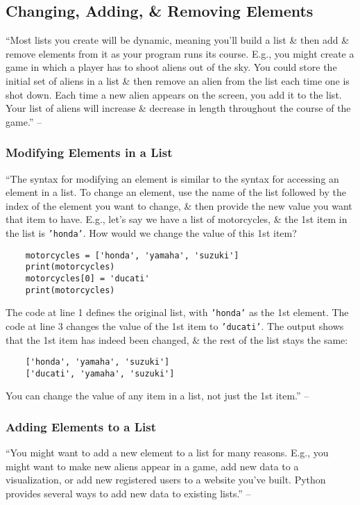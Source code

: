 \documentclass[oneside]{book}
\numberwithin{equation}{section}
\begin{document}
\subsection{Changing, Adding, \& Removing Elements}
``Most lists you create will be dynamic, meaning you'll build a list \& then add \& remove elements from it as your program runs its course. E.g., you might create a game in which a player has to shoot aliens out of the sky. You could store the initial set of aliens in a list \& then remove an alien from the list each time one is shot down. Each time a new alien appears on the screen, you add it to the list. Your list of aliens will increase \& decrease in length throughout the course of the game.'' -- \cite[p. 36]{Matthes2019}

\subsubsection{Modifying Elements in a List}
``The syntax for modifying an element is similar to the syntax for accessing an element in a list. To change an element, use the name of the list followed by the index of the element you want to change, \& then provide the new value you want that item to have. E.g., let's say we have a list of motorcycles, \& the 1st item in the list is \texttt{'honda'}. How would we change the value of this 1st item?
\begin{verbatim}
	motorcycles = ['honda', 'yamaha', 'suzuki']
	print(motorcycles)	
	motorcycles[0] = 'ducati'
	print(motorcycles)
\end{verbatim}
The code at line 1 defines the original list, with \texttt{'honda'} as the 1st element. The code at line 3 changes the value of the 1st item to \texttt{'ducati'}. The output shows that the 1st item has indeed been changed, \& the rest of the list stays the same:
\begin{verbatim}
	['honda', 'yamaha', 'suzuki']
	['ducati', 'yamaha', 'suzuki']
\end{verbatim}
You can change the value of any item in a list, not just the 1st item.'' -- \cite[pp. 36--37]{Matthes2019}

\subsubsection{Adding Elements to a List}
``You might want to add a new element to a list for many reasons. E.g., you might want to make new aliens appear in a game, add new data to a visualization, or add new registered users to a website you've built. Python provides several ways to add new data to existing lists.'' -- \cite[p. 37]{Matthes2019}
\end{document}
